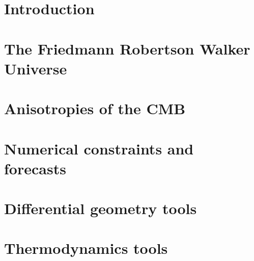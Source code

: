 \documentclass[12pt,a4paper]{book}
\begin{document}
\frontmatter 

\null\thispagestyle{empty}
\newpage
\thispagestyle{empty}
\vspace*{\fill}
\begin{minipage}[t]{0.9\textwidth}
\end{minipage}
\vspace*{5cm}
\newpage
\null\thispagestyle{empty}
\newpage

 
\tableofcontents

\mainmatter
\setlength{\parskip}{.5em} %
\chapter*{Introduction}

\chapter{The Friedmann Robertson Walker Universe}








\chapter{Anisotropies of the CMB}
\label{chap:anisotropies}




\chapter{Numerical constraints and forecasts}



\appendix
\chapter{Differential geometry tools}

\chapter{Thermodynamics tools}




 
  
\end{document}
